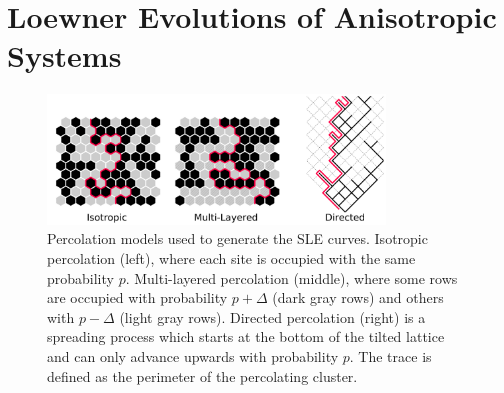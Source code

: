 \chapter{Loewner Evolutions of Anisotropic Systems}
\label{ch:asle}

\begin{figure}[b]
\begin{center}
    \includegraphics[width=0.8\textwidth]{chapters/ch6-asle/figs/models}
\end{center}
\caption{Percolation models used to generate the SLE curves. Isotropic
    percolation (left), where each site is occupied with the same probability
    $p$. Multi-layered percolation (middle), where some rows are occupied with
    probability $p+\Delta$ (dark gray rows) and others with $p-\Delta$ (light
    gray rows). Directed percolation (right) is a spreading process which
    starts at the bottom of the tilted lattice and can only advance upwards
    with probability $p$. The trace is defined as the perimeter of the
    percolating cluster.}
\label{fig:models}
\end{figure}

